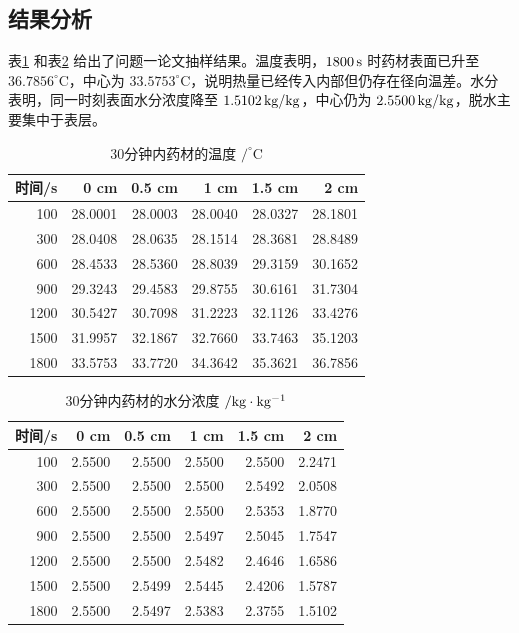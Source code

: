 \documentclass[UTF8,a4paper,12pt]{ctexart}
\numberwithin{equation}{section}
\begin{document}
\subsection{结果分析}
表\ref{tab:q1-temp} 和表\ref{tab:q1-moist} 给出了问题一论文抽样结果。温度表明，$1800\rm\,s$ 时药材表面已升至 $36.7856^\circ\mathrm C$，中心为 $33.5753^\circ\mathrm C$，说明热量已经传入内部但仍存在径向温差。水分表明，同一时刻表面水分浓度降至 $1.5102\rm\,kg/kg$，中心仍为 $2.5500\rm\,kg/kg$，脱水主要集中于表层。

\begin{table}[H]
  \centering
  \caption{30分钟内药材的温度 $/^\circ\mathrm C$}
  \label{tab:q1-temp}
  \begin{tabular}{rrrrrr}
    \toprule
    时间/s & 0 cm & 0.5 cm & 1 cm & 1.5 cm & 2 cm\\ \midrule
    100 & 28.0001 & 28.0003 & 28.0040 & 28.0327 & 28.1801\\
    300 & 28.0408 & 28.0635 & 28.1514 & 28.3681 & 28.8489\\
    600 & 28.4533 & 28.5360 & 28.8039 & 29.3159 & 30.1652\\
    900 & 29.3243 & 29.4583 & 29.8755 & 30.6161 & 31.7304\\
    1200 & 30.5427 & 30.7098 & 31.2223 & 32.1126 & 33.4276\\
    1500 & 31.9957 & 32.1867 & 32.7660 & 33.7463 & 35.1203\\
    1800 & 33.5753 & 33.7720 & 34.3642 & 35.3621 & 36.7856\\
    \bottomrule
  \end{tabular}
\end{table}

\begin{table}[H]
  \centering
  \caption{30分钟内药材的水分浓度 $/\rm kg\cdot kg^{-1}$}
  \label{tab:q1-moist}
  \begin{tabular}{rrrrrr}
    \toprule
    时间/s & 0 cm & 0.5 cm & 1 cm & 1.5 cm & 2 cm\\ \midrule
    100 & 2.5500 & 2.5500 & 2.5500 & 2.5500 & 2.2471\\
    300 & 2.5500 & 2.5500 & 2.5500 & 2.5492 & 2.0508\\
    600 & 2.5500 & 2.5500 & 2.5500 & 2.5353 & 1.8770\\
    900 & 2.5500 & 2.5500 & 2.5497 & 2.5045 & 1.7547\\
    1200 & 2.5500 & 2.5500 & 2.5482 & 2.4646 & 1.6586\\
    1500 & 2.5500 & 2.5499 & 2.5445 & 2.4206 & 1.5787\\
    1800 & 2.5500 & 2.5497 & 2.5383 & 2.3755 & 1.5102\\
    \bottomrule
  \end{tabular}
\end{table}
\end{document}
